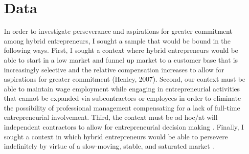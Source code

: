 \documentclass{article}
\begin{document}
\section{Data}
In order to investigate perseverance and aspirations for greater commitment among hybrid entrepreneurs, I sought a sample that would be bound in the following ways.  First, I sought a context where hybrid entrepreneurs would be able to start in a low market and funnel up market to a customer base that is increasingly selective and the relative compensation increases to allow for aspirations for greater commitment (Henley, 2007).  Second, our context must be able to maintain wage employment while engaging in entrepreneurial activities \cite{folta2010hybrid} that cannot be expanded via subcontractors or employees \cite{devries2020explaining} in order to eliminate the possibility of professional management compensating for a lack of full-time entrepreneurial involvement. Third, the context must be ad hoc/at will independent contractors to allow for entrepreneurial decision making \cite{shepherd2022machines,shepherd2015thinking}.  Finally, I sought a context in which hybrid entrepreneurs would be able to persevere indefinitely by virtue of a slow-moving, stable, and saturated market \cite{burtch2018can}. 
\end{document}
